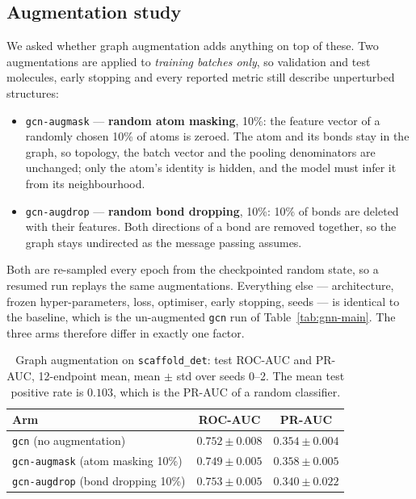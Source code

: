 \documentclass[conference]{IEEEtran}
\newcommand{\code}[1]{\texttt{\small #1}}
\begin{document}
\subsection{Augmentation study}
We asked whether graph augmentation adds anything on top of these. Two augmentations are applied
to \emph{training batches only}, so validation and test molecules, early stopping and every
reported metric still describe unperturbed structures:

\begin{itemize}
  \item \code{gcn-augmask} --- \textbf{random atom masking}, 10\%: the feature vector of a
        randomly chosen 10\% of atoms is zeroed. The atom and its bonds stay in the graph, so
        topology, the batch vector and the pooling denominators are unchanged; only the atom's
        identity is hidden, and the model must infer it from its neighbourhood.
  \item \code{gcn-augdrop} --- \textbf{random bond dropping}, 10\%: 10\% of bonds are deleted
        with their features. Both directions of a bond are removed together, so the graph stays
        undirected as the message passing assumes.
\end{itemize}

Both are re-sampled every epoch from the checkpointed random state, so a resumed run replays the
same augmentations. Everything else --- architecture, frozen hyper-parameters, loss, optimiser,
early stopping, seeds --- is identical to the baseline, which is the un-augmented \code{gcn} run
of Table~\ref{tab:gnn-main}. The three arms therefore differ in exactly one factor.

\begin{table}[t]
\centering
\caption{Graph augmentation on \code{scaffold\_det}: test ROC-AUC and PR-AUC, 12-endpoint mean,
mean $\pm$ std over seeds 0--2. The mean test positive rate is $0.103$, which is the PR-AUC of a
random classifier.}
\label{tab:augmentation}
\begin{tabular}{lcc}
\toprule
Arm & ROC-AUC & PR-AUC \\
\midrule
\code{gcn} (no augmentation) & $0.752 \pm 0.008$ & $0.354 \pm 0.004$ \\
\code{gcn-augmask} (atom masking 10\%) & $0.749 \pm 0.005$ & $0.358 \pm 0.005$ \\
\code{gcn-augdrop} (bond dropping 10\%) & $0.753 \pm 0.005$ & $0.340 \pm 0.022$ \\
\bottomrule
\end{tabular}
\end{table}
\end{document}
